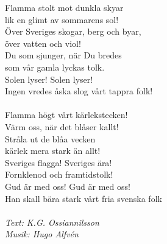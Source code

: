 \vspace{10pt}
Flamma stolt mot dunkla skyar\\
lik en glimt av sommarens sol!\\
Över Sveriges skogar, berg och byar,\\
över vatten och viol!\\
Du som sjunger, när Du bredes\\
som vår gamla lyckas tolk.\\
Solen lyser! Solen lyser!\\
Ingen vredes åska slog vårt tappra folk!\\
\\
Flamma högt vårt kärlekstecken!\\
Värm oss, när det blåser kallt!\\
Stråla ut de blåa vecken\\
kärlek mera stark än allt!\\
Sveriges flagga! Sveriges ära!\\
Fornklenod och framtidstolk!\\
Gud är med oss! Gud är med oss!\\
Han skall bära stark vårt fria svenska folk\\
\\
{\footnotesize\textit{Text: K.G. Ossiannilsson\\
Musik: Hugo Alfvén}}
\clearpage
